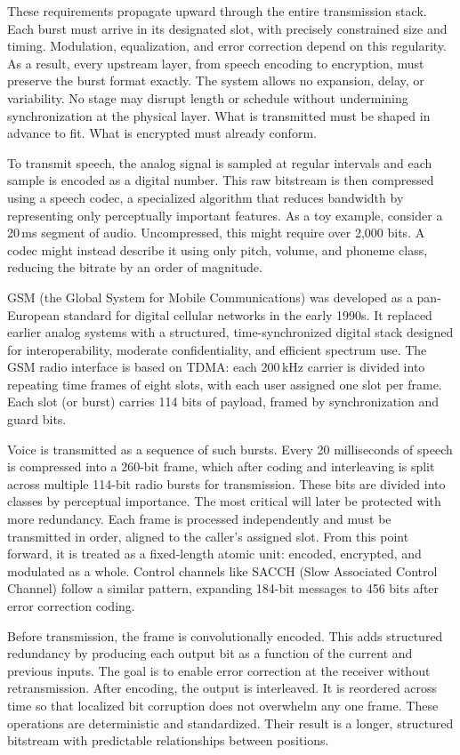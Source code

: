 These requirements propagate upward through the entire transmission stack. Each burst must arrive in its designated slot, with precisely constrained size and timing. Modulation, equalization, and error correction depend on this regularity. As a result, every upstream layer, from speech encoding to encryption, must preserve the burst format exactly. The system allows no expansion, delay, or variability. No stage may disrupt length or schedule without undermining synchronization at the physical layer. What is transmitted must be shaped in advance to fit. What is encrypted must already conform.

To transmit speech, the analog signal is sampled at regular intervals and each sample is encoded as a digital number. This raw bitstream is then compressed using a speech codec, a specialized algorithm that reduces bandwidth by representing only perceptually important features. As a toy example, consider a 20 ms segment of audio. Uncompressed, this might require over 2,000 bits. A codec might instead describe it using only pitch, volume, and phoneme class, reducing the bitrate by an order of magnitude.

GSM (the Global System for Mobile Communications) was developed as a pan-European standard for digital cellular networks in the early 1990s. It replaced earlier analog systems with a structured, time-synchronized digital stack designed for interoperability, moderate confidentiality, and efficient spectrum use. The GSM radio interface is based on TDMA: each 200 kHz carrier is divided into repeating time frames of eight slots, with each user assigned one slot per frame. Each slot (or burst) carries 114 bits of payload, framed by synchronization and guard bits.

Voice is transmitted as a sequence of such bursts. Every 20 milliseconds of speech is compressed into a 260-bit frame, which after coding and interleaving is split across multiple 114-bit radio bursts for transmission. These bits are divided into classes by perceptual importance. The most critical will later be protected with more redundancy. Each frame is processed independently and must be transmitted in order, aligned to the caller’s assigned slot. From this point forward, it is treated as a fixed-length atomic unit: encoded, encrypted, and modulated as a whole. Control channels like SACCH (Slow Associated Control Channel) follow a similar pattern, expanding 184-bit messages to 456 bits after error correction coding.

Before transmission, the frame is convolutionally encoded. This adds structured redundancy by producing each output bit as a function of the current and previous inputs. The goal is to enable error correction at the receiver without retransmission. After encoding, the output is interleaved. It is reordered across time so that localized bit corruption does not overwhelm any one frame. These operations are deterministic and standardized. Their result is a longer, structured bitstream with predictable relationships between positions.


